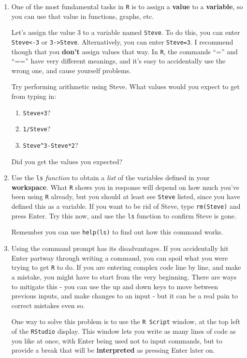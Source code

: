 \documentclass[11pt,a4paper]{article}
\begin{document}
\begin{enumerate}
\item One of the most fundamental tasks in \texttt{R} is to assign a \textbf{value} to a \textbf{variable}, so you can use that value in functions, graphs, etc.

Let's assign the value 3 to a variable named \texttt{Steve}. To do this, you can enter \texttt{Steve<-3} or \texttt{3->Steve}. Alternatively, you can enter \texttt{Steve=3}. I recommend though that you \textbf{don't} assign values that way. In \texttt{R}, the commands ``='' and ``=='' have very different meanings, and it's easy to accidentally use the wrong one, and cause yourself problems.

Try performing arithmetic using Steve. What values would you expect to get from typing in:
\begin{enumerate}
\item \texttt{Steve+3}?
\item \texttt{1/Steve}?
\item \texttt{Steve}\texttt{\^}\texttt{3-Steve*2}?
\end{enumerate}

Did you get the values you expected?
\item Use the \texttt{ls} \emph{function} to obtain a \emph{list} of the variables defined in your \textbf{workspace}. What \texttt{R} shows you in response will depend on how much you've been using \texttt{R} already, but you should at least see \texttt{Steve} listed, since you have defined this as a variable. If you want to be rid of Steve, type \texttt{rm(Steve)} and press Enter. Try this now, and use the \texttt{ls} function to confirm Steve is gone.

Remember you can use \texttt{help(ls)} to find out how this command works.
 

\item Using the command prompt has its disadvantages. If you accidentally hit Enter partway through writing a command, you can spoil what you were trying to get \texttt{R} to do. If you are entering complex code line by line, and make a mistake, you might have to start from the very beginning. There are ways to mitigate this - you can use the up and down keys to move between previous inputs, and make changes to an input - but it can be a real pain to correct mistakes even so.

One way to solve this problem is to use the \texttt{R Script} window, at the top left of the \texttt{RStudio} display. This window lets you write as many lines of code as you like at once, with Enter being used not to input commands, but to provide a break that will be \textbf{interpreted} as pressing Enter later on.


\end{enumerate}
\end{document}
